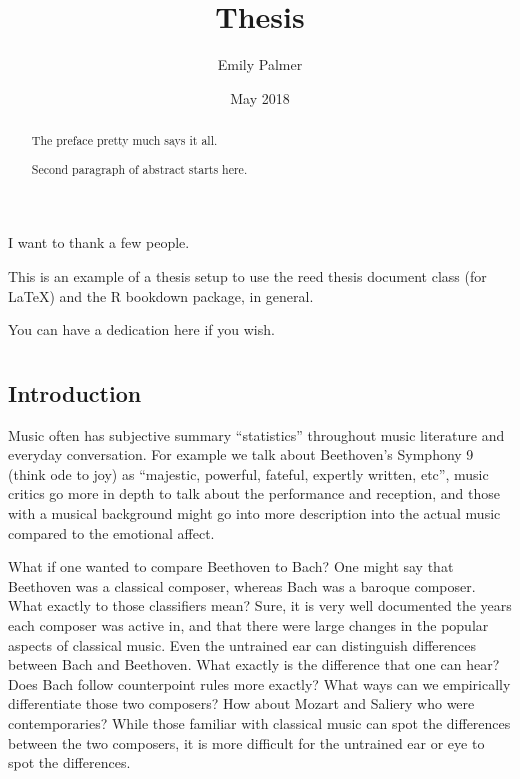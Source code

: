 \documentclass[12pt,twoside]{reedthesis}
\title{Thesis}
\author{Emily Palmer}
\date{May 2018}
\theoremstyle{definition}
\theoremstyle{definition}
\theoremstyle{definition}
\theoremstyle{remark}
\begin{document}
  \maketitle

\frontmatter %
\pagestyle{empty} %
  \begin{acknowledgements}
    I want to thank a few people.
  \end{acknowledgements}
  \begin{preface}
    This is an example of a thesis setup to use the reed thesis document
    class (for LaTeX) and the R bookdown package, in general.
  \end{preface}
  \hypersetup{linkcolor=black}
  \setcounter{tocdepth}{2}
  \tableofcontents

  \listoftables

  \listoffigures
  \begin{abstract}
    The preface pretty much says it all. \par
    
    Second paragraph of abstract starts here.
  \end{abstract}
  \begin{dedication}
    You can have a dedication here if you wish.
  \end{dedication}
\mainmatter %
\pagestyle{fancyplain} %

\chapter{}\label{section}

\section{Introduction}\label{introduction}

Music often has subjective summary ``statistics'' throughout music
literature and everyday conversation. For example we talk about
Beethoven's Symphony 9 (think ode to joy) as ``majestic, powerful,
fateful, expertly written, etc'', music critics go more in depth to talk
about the performance and reception, and those with a musical background
might go into more description into the actual music compared to the
emotional affect.

What if one wanted to compare Beethoven to Bach? One might say that
Beethoven was a classical composer, whereas Bach was a baroque composer.
What exactly to those classifiers mean? Sure, it is very well documented
the years each composer was active in, and that there were large changes
in the popular aspects of classical music. Even the untrained ear can
distinguish differences between Bach and Beethoven. What exactly is the
difference that one can hear? Does Bach follow counterpoint rules more
exactly? What ways can we empirically differentiate those two composers?
How about Mozart and Saliery who were contemporaries? While those
familiar with classical music can spot the differences between the two
composers, it is more difficult for the untrained ear or eye to spot the
differences.
\end{document}
